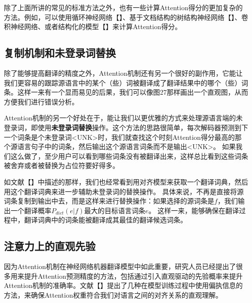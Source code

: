 \documentclass[10pt,a4paper]{ctexart}
\begin{document}
除了上面所讲的常见的标准方法之外，也有一些计算Attention得分的更加复杂的方法。例如，可以使用循环神经网络【】、基于文档结构的树结构神经网络【】、卷积神经网络、或者结构化的模型【】来计算Attention得分。

\subsection{复制机制和未登录词替换}
除了能够提高翻译的精度之外，Attention机制还有另一个很好的副作用，它能让我们更容易的跟踪源语言中的某个（些）词被翻译成了翻译结果中的哪个（些）词条。这样一来有一个显而易见的后果，我们可以像图27那样画出一个直观图，从而方便我们进行错误分析。

Attention机制的另一个好处在于，能让我们以更优雅的方式来处理源语言端的未登录词，即使用\textbf{未登录词替换}操作。这个方法的思路很简单，每次解码器预测到下一个词条是个未登录词<UNK>时，我们就查找这个时刻Attention得分最高的那个源语言句子中的词条，然后输出这个源语言词条而不是输出<UNK>。
如果我们这么做了，至少用户可以看到哪些词条没有被翻译出来，这样总比看到这些词条被舍弃或者被替换为占位符要好得多。

如文献【】中描述的那样，我们也经常看到用对齐模型来获取一个翻译词典，然后用这个翻译词典来进一步辅助未登录词的替换操作。
具体来说，不再是直接将源词条复制到输出中去，而是这样来进行替换操作：如果选择的源词条是$f$，我们输出一个翻译概率$P_{dict}(e|f)$最大的目标语言词条$e$。
这样一来，能够确保在翻译过程中，翻译词典中的词条能被翻译成其最佳的翻译候选词条。

\subsection{注意力上的直观先验}
因为Attention机制在神经网络机器翻译模型中如此重要，研究人员已经提出了很多用来提升Attention预测精度的方法，包括通过引入直观驱动的先验概率来提升Attention机制的准确率。文献【】提出了几种在模型训练过程中使用偏执信息的方法，来确保Attention权重符合我们对语言之间的对齐关系的直观理解。
\end{document}
